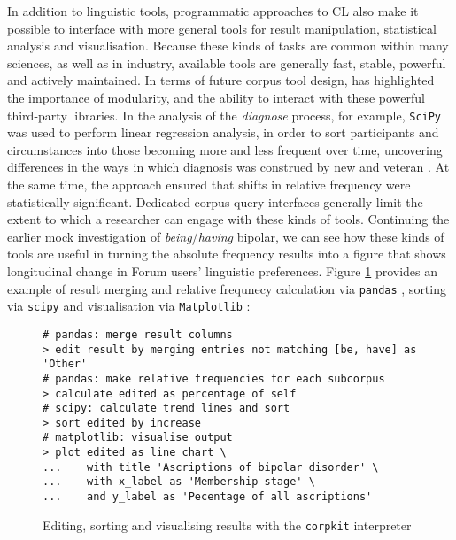 In addition to linguistic tools, programmatic approaches to \gls{CL} also make it possible to interface with more general tools for result manipulation, statistical analysis and visualisation. Because these kinds of tasks are common within many sciences, as well as in industry, available tools are generally fast, stable, powerful and actively maintained. In terms of future \gls{corpus} tool design, \textcite{anthony_critical_2013} has highlighted the importance of modularity, and the ability to interact with these powerful third\hyp{}party libraries. In the analysis of the \emph{diagnose} process, for example, \texttt{SciPy} \cite{scipy2001} was used to perform linear regression analysis, in order to sort participants and circumstances into those becoming more and less frequent over time, uncovering differences in the ways in which diagnosis was construed by new and veteran . At the same time, the approach ensured that shifts in relative frequency were statistically significant. Dedicated \gls{corpus} query interfaces generally limit the extent to which a researcher can engage with these kinds of tools. Continuing the earlier mock investigation of \emph{being}\slash \emph{having} \gls{bipolar}, we can see how these kinds of tools are useful in turning the absolute frequency results into a figure that shows longitudinal change in Forum users' linguistic preferences. Figure \ref{fig:edit-calc-vis} provides an example of result merging and relative frequnecy calculation via \texttt{pandas} \cite{mckinney_pandas_2010}, sorting via \texttt{scipy} \cite{scipy2001} and visualisation via \texttt{Matplotlib} \cite{matplotlib_2007}:

\begin{figure}[htb]
\begin{verbatim}
# pandas: merge result columns
> edit result by merging entries not matching [be, have] as 'Other'
# pandas: make relative frequencies for each subcorpus
> calculate edited as percentage of self
# scipy: calculate trend lines and sort
> sort edited by increase
# matplotlib: visualise output
> plot edited as line chart \
...    with title 'Ascriptions of bipolar disorder' \
...    with x_label as 'Membership stage' \
...    and y_label as 'Pecentage of all ascriptions'
\end{verbatim}
\caption[Editing, sorting and visualising results]{Editing, sorting and visualising results with the \texttt{corpkit} interpreter}
\label{fig:edit-calc-vis}
\end{figure}
%

